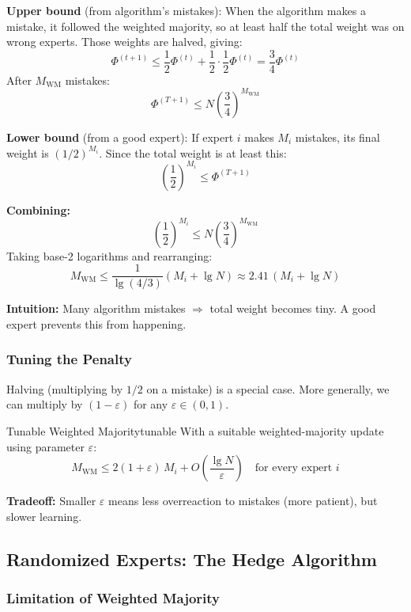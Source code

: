 \textbf{Upper bound} (from algorithm's mistakes): When the algorithm makes a mistake, it followed the weighted majority, so at least half the total weight was on wrong experts. Those weights are halved, giving:
\[
\Phi^{(t+1)} \leq \frac{1}{2}\Phi^{(t)} + \frac{1}{2} \cdot \frac{1}{2}\Phi^{(t)} = \frac{3}{4}\Phi^{(t)}
\]
After $M_{\mathrm{WM}}$ mistakes:
\[
\Phi^{(T+1)} \leq N \left(\frac{3}{4}\right)^{M_{\mathrm{WM}}}
\]

\textbf{Lower bound} (from a good expert): If expert $i$ makes $M_i$ mistakes, its final weight is $(1/2)^{M_i}$. Since the total weight is at least this:
\[
\left(\frac{1}{2}\right)^{M_i} \leq \Phi^{(T+1)}
\]

\textbf{Combining:}
\[
\left(\frac{1}{2}\right)^{M_i} \leq N \left(\frac{3}{4}\right)^{M_{\mathrm{WM}}}
\]
Taking base-2 logarithms and rearranging:
\[
M_{\mathrm{WM}} \leq \frac{1}{\lg(4/3)}(M_i + \lg N) \approx 2.41\,(M_i + \lg N)
\]

\textbf{Intuition:} Many algorithm mistakes $\Rightarrow$ total weight becomes tiny. A good expert prevents this from happening.

\subsubsection{Tuning the Penalty}

Halving (multiplying by $1/2$ on a mistake) is a special case. More generally, we can multiply by $(1-\varepsilon)$ for any $\varepsilon \in (0,1)$.

\begin{theorem}{Tunable Weighted Majority}{tunable}
With a suitable weighted-majority update using parameter $\varepsilon$:
\[
M_{\mathrm{WM}} \leq 2(1+\varepsilon)\,M_i + O\!\left(\frac{\lg N}{\varepsilon}\right) \quad \text{for every expert } i
\]
\end{theorem}

\textbf{Tradeoff:} Smaller $\varepsilon$ means less overreaction to mistakes (more patient), but slower learning.

\subsection{Randomized Experts: The Hedge Algorithm}

\subsubsection{Limitation of Weighted Majority}

